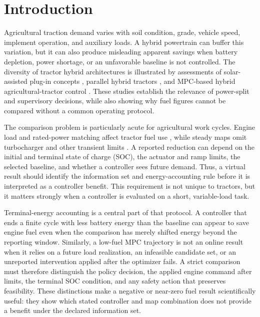 \documentclass[agriengineering,article,submit,moreauthors]{Definitions/mdpi}
\begin{document}
\section{Introduction}
Agricultural traction demand varies with soil condition, grade, vehicle speed, implement operation, and auxiliary loads. A hybrid powertrain can buffer this variation, but it can also produce misleading apparent savings when battery depletion, power shortage, or an unfavorable baseline is not controlled. The diversity of tractor hybrid architectures is illustrated by assessments of solar-assisted plug-in concepts \cite{mousazadeh2011}, parallel hybrid tractors \cite{mocera2020,mocera2020b}, and MPC-based hybrid agricultural-tractor control \cite{curiel2023}. These studies establish the relevance of power-split and supervisory decisions, while also showing why fuel figures cannot be compared without a common operating protocol.

The comparison problem is particularly acute for agricultural work cycles. Engine load and rated-power matching affect tractor fuel use \cite{jilek2008,janulevicius2010}, while steady maps omit turbocharger and other transient limits \cite{huo2018}. A reported reduction can depend on the initial and terminal state of charge (SOC), the actuator and ramp limits, the selected baseline, and whether a controller sees future demand. Thus, a virtual result should identify the information set and energy-accounting rule before it is interpreted as a controller benefit. This requirement is not unique to tractors, but it matters strongly when a controller is evaluated on a short, variable-load task.

Terminal-energy accounting is a central part of that protocol. A controller that ends a finite cycle with less battery energy than the baseline can appear to save engine fuel even when the comparison has merely shifted energy beyond the reporting window. Similarly, a low-fuel MPC trajectory is not an online result when it relies on a future load realization, an infeasible candidate set, or an unreported intervention applied after the optimizer fails. A strict comparison must therefore distinguish the policy decision, the applied engine command after limits, the terminal SOC condition, and any safety action that preserves feasibility. These distinctions make a negative or near-zero fuel result scientifically useful: they show which stated controller and map combination does not provide a benefit under the declared information set.
\end{document}
